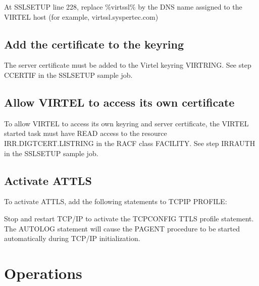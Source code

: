 \documentclass[letterpaper,10pt,english]{sphinxmanual}
\begin{document}
\sphinxAtStartPar
At SSLSETUP line 228, replace \%virtssl\% by the DNS name assigned to the VIRTEL host (for example, virtssl.syspertec.com)


\subsection{Add the certificate to the keyring}
\label{\detokenize{connectivity_guide:add-the-certificate-to-the-keyring}}
\sphinxAtStartPar
The server certificate must be added to the Virtel keyring \sphinxhyphen{} VIRTRING. See step CCERTIF in the SSLSETUP sample job.


\subsection{Allow VIRTEL to access its own certificate}
\label{\detokenize{connectivity_guide:allow-virtel-to-access-its-own-certificate}}
\sphinxAtStartPar
To allow VIRTEL to access its own keyring and server certificate, the VIRTEL started task must have READ access to the resource IRR.DIGTCERT.LISTRING in the RACF class FACILITY. See step IRRAUTH in the SSLSETUP sample job.


\subsection{Activate AT\sphinxhyphen{}TLS}
\label{\detokenize{connectivity_guide:activate-at-tls}}
\sphinxAtStartPar
To activate AT\sphinxhyphen{}TLS, add the following statements to TCPIP PROFILE:

\begin{sphinxVerbatim}[commandchars=\\\{\}]
 
   
\end{sphinxVerbatim}

\sphinxAtStartPar
Stop and restart TCP/IP to activate the TCPCONFIG TTLS profile statement. The AUTOLOG statement will cause the PAGENT procedure to be started automatically during TCP/IP initialization.

\newpage

\ignorespaces 

\section{Operations}
\label{\detokenize{connectivity_guide:operations}}\label{\detokenize{connectivity_guide:index-158}}
\end{document}
